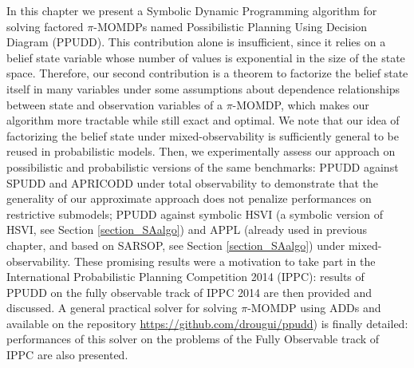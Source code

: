In this chapter we present a Symbolic Dynamic Programming
algorithm for solving factored $\pi$-MOMDPs named Possibilistic Planning Using
Decision Diagram (PPUDD). 
This contribution alone is insufficient, since it
relies on a belief state variable whose number of values is exponential
in the size of the state space. 
Therefore, our second contribution is a theorem
to factorize the belief state 
itself in many variables under some assumptions
about dependence relationships between state and observation 
variables of a $\pi$-MOMDP, 
which makes our algorithm more tractable while still exact and
optimal. We note that our idea of factorizing the belief state under
mixed-observability is sufficiently general to be reused in probabilistic
models.
Then, we experimentally assess our approach on possibilistic and
probabilistic versions of the same benchmarks: PPUDD against SPUDD
and APRICODD \cite{St-aubin00apricodd:approximate}
under total observability to demonstrate that the generality of our approximate approach does
not penalize performances on restrictive submodels; PPUDD against symbolic
HSVI \cite{Sim:2008:SHS:1620163.1620241}
(a symbolic version of HSVI, see Section \ref{section_SAalgo}) and APPL
\cite{Kurniawati-RSS08,OngShaoHsuWee-IJRR10}
(already used in previous chapter, and based on SARSOP, see Section \ref{section_SAalgo}) 
under mixed-observability. 
These promising results were a motivation to take part
in the International Probabilistic Planning Competition 2014 (IPPC):
results of PPUDD on the fully observable track of IPPC 2014
are then provided and discussed. 
A general practical solver for solving $\pi$-MOMDP using ADDs
and available on the repository \url{https://github.com/drougui/ppudd})
is finally detailed:
performances of this solver 
on the problems of the Fully Observable track of IPPC
are also presented.

